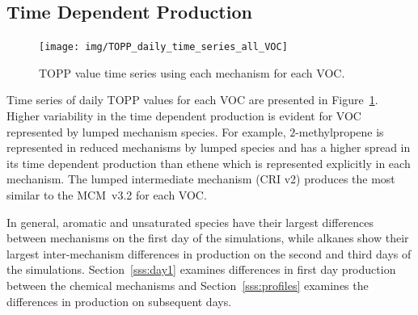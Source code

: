 \subsection[Time Dependent Ox Production]{Time Dependent  Production}
%
\begin{figure}
    \centering
    \texttt{[image: img/TOPP\_daily\_time\_series\_all\_VOC]}
    \vspace{0mm}
    \caption{TOPP value time series using each mechanism for each VOC.}
    \vspace{-4mm}
    \label{f:TOPP_dailies}
\end{figure}
%
Time series of daily TOPP values for each VOC are presented in \mbox{Figure \ref{f:TOPP_dailies}}. 
Higher variability in the time dependent  production is evident for VOC represented by lumped mechanism species.
For example, $2$-methylpropene is represented in reduced mechanisms by lumped species and has a higher spread in its time dependent  production than ethene which is represented explicitly in each mechanism.
The lumped intermediate mechanism (CRI v2) produces the most similar  to the \mbox{MCM v3.2} for each VOC.

In general, aromatic and unsaturated species have their largest differences between mechanisms on the first day of the simulations, while alkanes show their largest inter-mechanism differences in  production on the second and third days of the simulations.
\mbox{Section \ref{sss:day1}} examines differences in first day  production between the chemical mechanisms and \mbox{Section \ref{sss:profiles}} examines the differences in  production on subsequent days.
%
